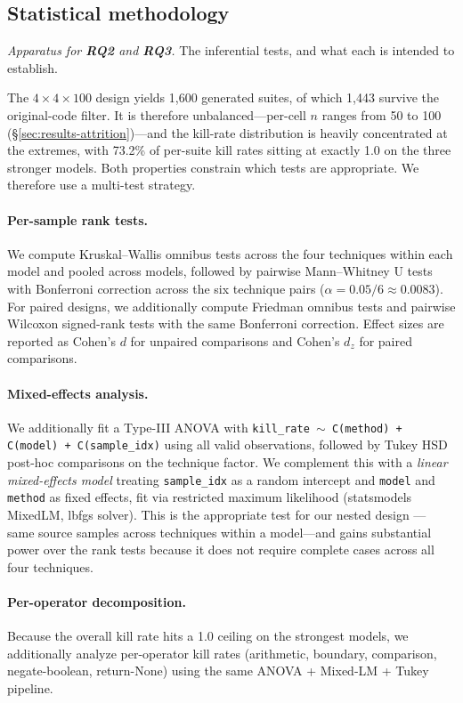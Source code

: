 \documentclass[smallextended]{svjour3}
\begin{document}
\subsection{Statistical methodology}\label{sec:methods-stats}

\emph{Apparatus for \textbf{RQ2} and \textbf{RQ3}.} The inferential tests, and
what each is intended to establish.


The $4 \times 4 \times 100$ design yields 1{,}600 generated
suites, of which 1{,}443 survive the original-code filter. It is
therefore unbalanced---per-cell $n$ ranges from 50 to 100
(\S\ref{sec:results-attrition})---and the kill-rate distribution is
heavily concentrated at the extremes, with 73.2\% of per-suite kill
rates sitting at exactly 1.0 on the three stronger models. Both
properties constrain which tests are appropriate. We therefore use a
multi-test strategy.

\paragraph{Per-sample rank tests.}
We compute Kruskal–Wallis omnibus tests across the four techniques
within each model and pooled across models, followed by pairwise
Mann–Whitney U tests with Bonferroni correction across the six
technique pairs ($\alpha = 0.05/6 \approx 0.0083$). For paired
designs, we additionally compute Friedman omnibus tests and pairwise
Wilcoxon signed-rank tests with the same Bonferroni correction.
Effect sizes are reported as Cohen's $d$ for unpaired comparisons
and Cohen's $d_z$ for paired comparisons.

\paragraph{Mixed-effects analysis.}
We additionally fit a Type-III ANOVA with 
\texttt{kill\_rate $\sim$ C(method) + C(model) + C(sample\_idx)} using all 
valid observations, followed by Tukey HSD post-hoc comparisons on 
the technique factor. We complement this with a \emph{linear 
mixed-effects model} treating \texttt{sample\_idx} as a random 
intercept and \texttt{model} and \texttt{method} as fixed effects, 
fit via restricted maximum likelihood (statsmodels MixedLM, lbfgs 
solver). This is the appropriate test for our nested design 
--- same source samples across techniques within a model---and gains substantial 
power over the rank tests because it does not require complete 
cases across all four techniques.

\paragraph{Per-operator decomposition.}
Because the overall kill rate hits a 1.0 ceiling on the strongest
models, we additionally analyze per-operator kill rates
(arithmetic, boundary, comparison, negate-boolean, return-None)
using the same ANOVA + Mixed-LM + Tukey pipeline.
\end{document}

